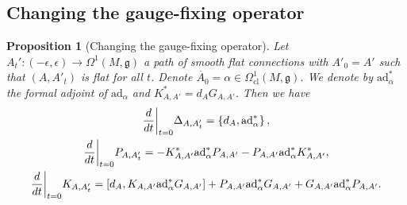 \documentclass[11pt,a4paper]{amsart}
\theoremstyle{plain} %
\newtheorem{prop}[thm]{Proposition}
\theoremstyle{definition}
\theoremstyle{remark}
\newcommand{\g}{\mathfrak{g}}
\newcommand{\dd}{d}
\newcommand{\mr}{\mathrm}
\newcommand\restr[2]{{%
  \left.\kern-\nulldelimiterspace %
  #1 %
  \vphantom{\big|} %
  \right|_{#2} %
  }}
\begin{document}
\subsection{Changing the gauge-fixing operator}
\begin{prop}[Changing the gauge-fixing operator]\label{prop:varAtprime} %
Let $A_t'\colon (-\epsilon,\epsilon) \to \Omega^1(M,\g)$ a path of smooth flat connections with $A'_0 = A'$ such that $(A,A'_t)$ is flat for all $t$. Denote $\dot{A_0} = \alpha \in \Omega^1_\mr{cl}(M,\g)$. We denote by $\mathrm{ad}_\alpha^*$ the formal adjoint of $\mathrm{ad}_\alpha$ and $K^*_{A,A'}= \dd_{A}  G_{A,A'}$. 
Then we have
\begin{gather}
\restr{\frac{d}{dt}}{t=0}\Delta_{A,A'_t} =  \left\lbrace \dd_{A},\mathrm{ad}^*_\alpha\right\rbrace, \label{eq:varLaplaceGF} \\
\restr{\frac{d}{dt}}{t=0} P_{A,A'_t} = - K^*_{A,A'} \mathrm{ad}^*_\alpha   P_{A,A'} - P_{A,A'}  \mathrm{ad}^*_\alpha   K^*_{A,A'},  \label{eq:varPharmGF} \\
\restr{\frac{d}{dt}}{t=0}{K}_{A,A'_t} =  \left[d_{A}, K_{A,A'}\mathrm{ad}_\alpha^*G_{A,A'}\right] + P_{A,A'}\mathrm{ad}^*_\alpha G_{A,A'} + G_{A,A'} \mathrm{ad}^*_\alpha P_{A,A'}.  \label{eq:varKGF}
\end{gather}
\end{prop}
\end{document}
